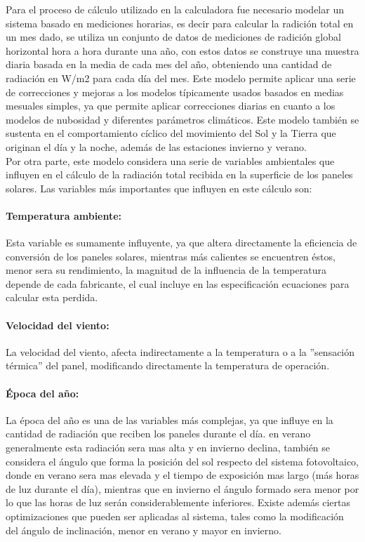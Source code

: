 Para el proceso de cálculo utilizado en la calculadora fue necesario modelar un sistema basado en mediciones horarias, es decir para calcular la radición total en un mes dado, se utiliza un conjunto de datos de mediciones de radición global horizontal hora a hora durante una año, con estos datos se construye una muestra diaria basada en la media de cada mes del año, obteniendo una cantidad de radiación en W/m2 para cada día del mes. Este modelo permite aplicar una serie de correcciones y mejoras a los modelos típicamente usados basados en medias mesuales simples, ya que permite aplicar correcciones diarias en cuanto a los modelos de nubosidad y diferentes parámetros climáticos. Este modelo también se sustenta en el comportamiento cíclico del movimiento del Sol y la Tierra que originan el día y la noche, además de las estaciones invierno y verano.\\
Por otra parte, este modelo considera una serie de variables ambientales que influyen en el cálculo de la radiación total recibida en la superficie de los paneles solares. Las variables más importantes que influyen en este cálculo son:

\paragraph{Temperatura ambiente:}
Esta variable es sumamente influyente, ya que altera directamente la eficiencia de conversión de los paneles solares, mientras más calientes se encuentren éstos, menor sera su rendimiento, la magnitud de la influencia de la temperatura depende de cada fabricante, el cual incluye en las especificación ecuaciones para calcular esta perdida.

\paragraph{Velocidad del viento:}
La velocidad del viento, afecta indirectamente a la temperatura o a la ''sensación térmica'' del panel, modificando directamente la temperatura de operación.

\paragraph{Época del año:}
La época del año es una de las variables más complejas, ya que influye en la cantidad de radiación que reciben los paneles durante el día. en verano generalmente esta radiación sera mas alta y en invierno declina, también se considera el ángulo que forma la posición del sol respecto del sistema fotovoltaico, donde en verano sera mas elevada y el tiempo de exposición mas largo (más horas de luz durante el día), mientras que en invierno el ángulo formado sera menor por lo que las horas de luz serán considerablemente inferiores. Existe además ciertas optimizaciones que pueden ser aplicadas al sistema, tales como la modificación del ángulo de inclinación, menor en verano y mayor en invierno.

